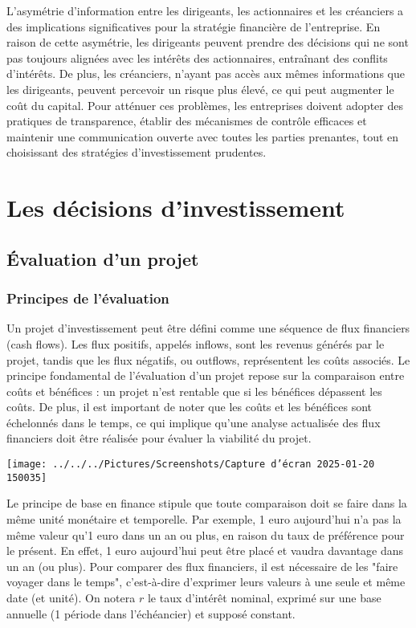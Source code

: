 \documentclass[a4paper, 12pt]{report}
\begin{document}
L'asymétrie d'information entre les dirigeants, les actionnaires et les créanciers a des implications significatives pour la stratégie financière de l'entreprise. En raison de cette asymétrie, les dirigeants peuvent prendre des décisions qui ne sont pas toujours alignées avec les intérêts des actionnaires, entraînant des conflits d'intérêts. De plus, les créanciers, n'ayant pas accès aux mêmes informations que les dirigeants, peuvent percevoir un risque plus élevé, ce qui peut augmenter le coût du capital. Pour atténuer ces problèmes, les entreprises doivent adopter des pratiques de transparence, établir des mécanismes de contrôle efficaces et maintenir une communication ouverte avec toutes les parties prenantes, tout en choisissant des stratégies d'investissement prudentes.

\part{Les décisions d'investissement}

\chapter{Évaluation d'un projet}

\section{Principes de l'évaluation}

Un projet d'investissement peut être défini comme une séquence de flux financiers (cash flows). Les flux positifs, appelés inflows, sont les revenus générés par le projet, tandis que les flux négatifs, ou outflows, représentent les coûts associés. Le principe fondamental de l'évaluation d'un projet repose sur la comparaison entre coûts et bénéfices : un projet n'est rentable que si les bénéfices dépassent les coûts. De plus, il est important de noter que les coûts et les bénéfices sont échelonnés dans le temps, ce qui implique qu'une analyse actualisée des flux financiers doit être réalisée pour évaluer la viabilité du projet.

\begin{center}
	\texttt{[image: ../../../Pictures/Screenshots/Capture d'écran 2025-01-20 150035]}
\end{center}

Le principe de base en finance stipule que toute comparaison doit se faire dans la même unité monétaire et temporelle. Par exemple, 1 euro aujourd'hui n'a pas la même valeur qu'1 euro dans un an ou plus, en raison du taux de préférence pour le présent. En effet, 1 euro aujourd'hui peut être placé et vaudra davantage dans un an (ou plus). Pour comparer des flux financiers, il est nécessaire de les "faire voyager dans le temps", c'est-à-dire d'exprimer leurs valeurs à une seule et même date (et unité). On notera \( r \) le taux d'intérêt nominal, exprimé sur une base annuelle (1 période dans l'échéancier) et supposé constant.
\end{document}
